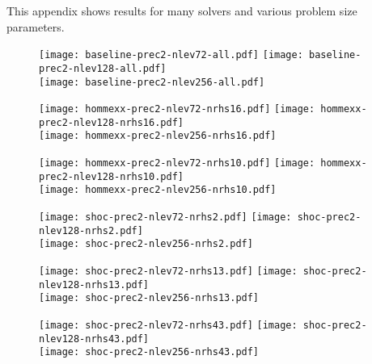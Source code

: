 \documentclass[10pt,twocolumn]{article}
\begin{document}

This appendix shows results for many solvers and various problem size parameters.

\begin{figure}[hbt]
  \centering
  \texttt{[image: baseline-prec2-nlev72-all.pdf]}
  \texttt{[image: baseline-prec2-nlev128-all.pdf]} \\
  \texttt{[image: baseline-prec2-nlev256-all.pdf]}
\end{figure}

\begin{figure}[hbt]
  \centering
  \texttt{[image: hommexx-prec2-nlev72-nrhs16.pdf]}
  \texttt{[image: hommexx-prec2-nlev128-nrhs16.pdf]} \\
  \texttt{[image: hommexx-prec2-nlev256-nrhs16.pdf]}
\end{figure}

\begin{figure}[hbt]
  \centering
  \texttt{[image: hommexx-prec2-nlev72-nrhs10.pdf]}
  \texttt{[image: hommexx-prec2-nlev128-nrhs10.pdf]} \\
  \texttt{[image: hommexx-prec2-nlev256-nrhs10.pdf]}
\end{figure}

\begin{figure}[hbt]
  \centering
  \texttt{[image: shoc-prec2-nlev72-nrhs2.pdf]}
  \texttt{[image: shoc-prec2-nlev128-nrhs2.pdf]} \\
  \texttt{[image: shoc-prec2-nlev256-nrhs2.pdf]}
\end{figure}

\begin{figure}[hbt]
  \centering
  \texttt{[image: shoc-prec2-nlev72-nrhs13.pdf]}
  \texttt{[image: shoc-prec2-nlev128-nrhs13.pdf]} \\
  \texttt{[image: shoc-prec2-nlev256-nrhs13.pdf]}
\end{figure}

\begin{figure}[hbt]
  \centering
  \texttt{[image: shoc-prec2-nlev72-nrhs43.pdf]}
  \texttt{[image: shoc-prec2-nlev128-nrhs43.pdf]} \\
  \texttt{[image: shoc-prec2-nlev256-nrhs43.pdf]}
\end{figure}
\end{document}
